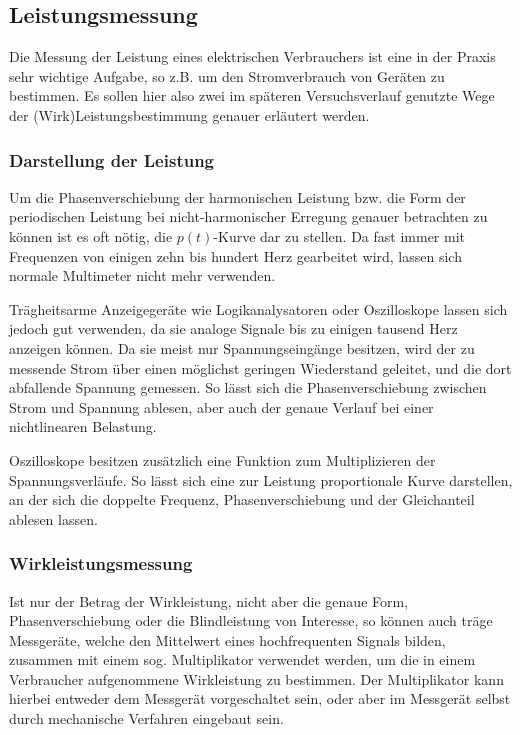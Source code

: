 \subsection{Leistungsmessung}
Die Messung der Leistung eines elektrischen Verbrauchers ist eine in der Praxis sehr wichtige Aufgabe, so z.B. um den Stromverbrauch von Geräten zu bestimmen. Es sollen hier also zwei im späteren Versuchsverlauf genutzte Wege der (Wirk)Leistungsbestimmung genauer erläutert werden.

\subsubsection{Darstellung der Leistung}
Um die Phasenverschiebung der harmonischen Leistung bzw. die Form der periodischen Leistung bei nicht-harmonischer Erregung genauer betrachten zu können ist es oft nötig, die $p(t)$-Kurve dar zu stellen. Da fast immer mit Frequenzen von einigen zehn bis hundert Herz gearbeitet wird, lassen sich normale Multimeter nicht mehr verwenden.

Trägheitsarme Anzeigegeräte wie Logikanalysatoren oder Oszilloskope lassen sich jedoch gut verwenden, da sie analoge Signale bis zu einigen tausend Herz anzeigen können. Da sie meist nur Spannungseingänge besitzen, wird der zu messende Strom über einen möglichst geringen Wiederstand geleitet, und die dort abfallende Spannung gemessen. So lässt sich die Phasenverschiebung zwischen Strom und Spannung ablesen, aber auch der genaue Verlauf bei einer nichtlinearen Belastung.

Oszilloskope besitzen zusätzlich eine Funktion zum Multiplizieren der Spannungsverläufe. So lässt sich eine zur Leistung proportionale Kurve darstellen, an der sich die doppelte Frequenz, Phasenverschiebung und der Gleichanteil ablesen lassen.

\subsubsection{Wirkleistungsmessung}
Ist nur der Betrag der Wirkleistung, nicht aber die genaue Form, Phasenverschiebung oder die Blindleistung von Interesse, so können auch träge Messgeräte, welche den Mittelwert eines hochfrequenten Signals bilden, zusammen mit einem sog. Multiplikator verwendet werden, um die in einem Verbraucher aufgenommene Wirkleistung zu bestimmen. Der Multiplikator kann hierbei entweder dem Messgerät vorgeschaltet sein, oder aber im Messgerät selbst durch mechanische Verfahren eingebaut sein.